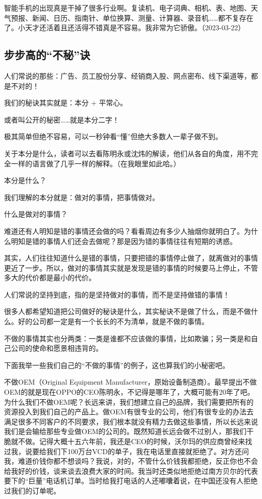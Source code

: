 智能手机的出现真是干掉了很多行业啊。复读机、电子词典、相机、表、地图、天气预报、新闻、日历、指南针、单位换算、测量、计算器、录音机……都不复存在了。小天才还活着且还活得不错真是不容易。我非常为它骄傲。（2023-03-22）

\subsection{步步高的“不秘”诀}

人们常说的那些：广告、员工股份分享、经销商入股、网点密布、线下渠道等，都是不对的！

我们的秘诀其实就是：本分 + 平常心。

或者叫公开的秘密……就是本分二字！

极其简单但绝不容易，可以一秒钟看“懂”但绝大多数人一辈子做不到。

关于本分是什么，读者可以去看陈明永或沈炜的解读，他们从各自的角度，用不完全一样的语言做了几乎一样的解释。（在我眼里如此哈。）

本分是什么？

我们理解的本分就是：做对的事情，把事情做对。

什么是做对的事情？

难道还有人明知是错的事情还会做的吗？看看周边有多少人抽烟你就明白了。为什么明知是错的事情人们还会去做呢？那是因为错的事情往往有短期的诱惑。

其实，人们往往知道什么是错的事情，只要把错的事情停止做了，就离做对的事情更近了一步。所以，做对的事情其实就是发现是错的事情的时候要马上停止，不管多大的代价都是最小的代价。

人们常说的坚持到底，指的是坚持做对的事情，而不是坚持做错的事情！

很多人都希望知道把公司做好的秘诀是什么，其实秘诀不是做了什么，而是不做什么。好的公司都一定是有一个长长的不为清单，就是不做的事情。

不做的事情其实也分两类：一类是谁都不应该做的事情，比如欺骗；另一类是和自己公司的使命和愿景相违背的。

下面我举一些我们自己的“不做的事情”的例子，这也算我们的小秘密吧。

不做OEM（Original Equipment Manufacturer，原始设备制造商）。最早提出不做OEM的就是现在OPPO的CEO陈明永，不记得是哪年了，大概可能有20年了吧。为什么我们不做OEM呢？长远来讲，我们想建立自己的品牌，我们需要把所有的资源投入到我们自己的产品上。做OEM有很专业的公司，他们有很专业的办法去满足很多不同客户的不同要求，我们根本就没有精力去做这些事情，所以长远来说我们是会输给那些专业做OEM的公司的。既然知道长远会做不过别人，那我们干脆就不做。记得大概十五六年前，我还是CEO的时候，沃尔玛的供应商曾经来找过我，说要给我们下100万台VCD的单子，我在电话里直接就拒绝了。对方还问我，难道价钱你都不想谈吗？我说，对的，不管什么价钱我都拒绝，反正你也不会给我好的价钱，谈来谈去浪费大家的时间。我当时还类似地拒绝过南方贝尔的代表要下的“巨量”电话机订单。当时给我打电话的人还嘟囔着说，在中国还没有人拒绝过我们的订单呢。

